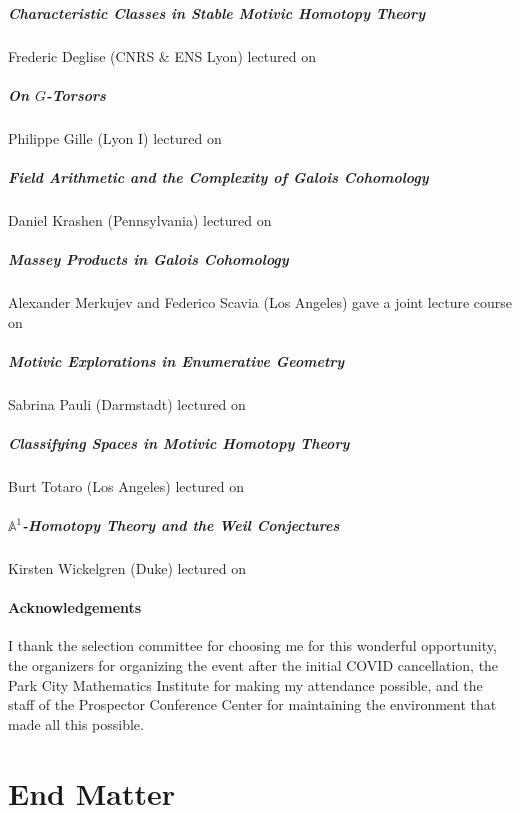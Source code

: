 \documentclass{amsart}
\theoremstyle{definition}
\numberwithin{equation}{section}
\begin{document}
\subsubsection*{Characteristic Classes in Stable Motivic Homotopy Theory} Frederic Deglise (CNRS \& ENS Lyon) lectured on 

\subsubsection*{On $G$-Torsors} Philippe Gille (Lyon I) lectured on 

\subsubsection*{Field Arithmetic and the Complexity of Galois Cohomology} Daniel Krashen (Pennsylvania) lectured on 

\subsubsection*{Massey Products in Galois Cohomology} Alexander Merkujev and Federico Scavia (Los Angeles) gave a joint lecture course on 

\subsubsection*{Motivic Explorations in Enumerative Geometry} Sabrina Pauli (Darmstadt) lectured on 

\subsubsection*{Classifying Spaces in Motivic Homotopy Theory} Burt Totaro (Los Angeles) lectured on

\subsubsection*{$\mathbb{A}^{1}$-Homotopy Theory and the Weil Conjectures} Kirsten Wickelgren (Duke) lectured on 

\subsection*{Acknowledgements} I thank the selection committee for choosing me for this wonderful opportunity, the organizers for organizing the event after the initial COVID cancellation, the Park City Mathematics Institute for making my attendance possible, and the staff of the Prospector Conference Center for maintaining the environment that made all this possible. 
\newpage
\tableofcontents









\newpage
\part*{End Matter}
\printbibliography
\end{document}
